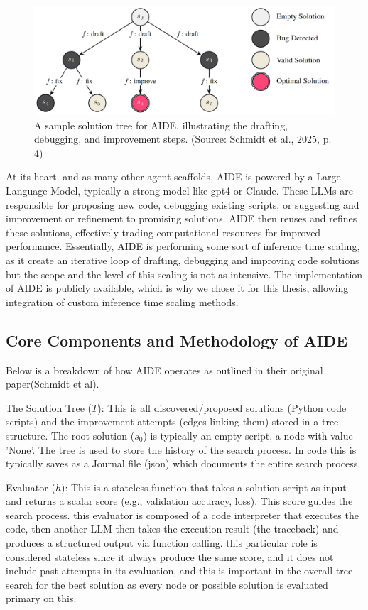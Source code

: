 \begin{figure}[htbp]
    \centering
    \includegraphics[width=0.8\linewidth]{images/aide-solution-tree.png}
    \caption{A sample solution tree for AIDE, illustrating the drafting, debugging, and improvement steps. (Source: Schmidt et al., 2025, p. 4)}
    \label{fig:aide-solution-tree}
\end{figure}

At its heart. and as many other agent scaffolds, AIDE is powered by a Large Language Model, typically a strong model like gpt4 or Claude. These LLMs are responsible for proposing new code, debugging existing scripts, or suggesting and improvement or refinement to promising solutions. AIDE then reuses and refines these solutions, effectively trading computational resources for improved performance. Essentially, AIDE is performing some sort of inference time scaling, as it create an iterative loop of drafting, debugging and improving code solutions but the scope and the level of this scaling is not as intensive. The implementation of AIDE is publicly available, which is why we chose it for this thesis, allowing integration of custom inference time scaling methods.

\subsection{Core Components and Methodology of AIDE}
Below is a breakdown of how AIDE operates as outlined in their original paper(Schmidt et al).

The Solution Tree ($T$): This is all discovered/proposed solutions (Python code scripts) and the improvement attempts (edges linking them) stored in a tree structure. The root solution ($s_0$) is typically an empty script, a node with value 'None'. The tree is used to store the history of the search process. In code this is typically saves as a Journal file (json) which documents the entire search process.

Evaluator ($h$): This is a stateless function that takes a solution script as input and returns a scalar score (e.g., validation accuracy, loss). This score guides the search process. this evaluator is composed of a code interpreter that executes the code, then another LLM then takes the execution result (the traceback) and produces a structured output via function calling. this particular role is considered stateless since it always produce the same score, and it does not include past attempts in its evaluation, and this is important in the overall tree search for the best solution as every node or possible solution is evaluated primary on this.


